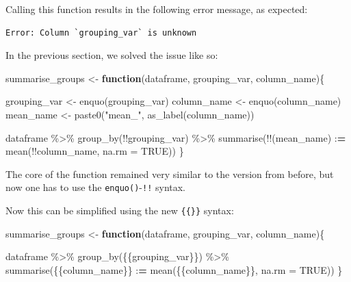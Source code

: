 \documentclass[
]{article}
\newenvironment{Shaded}{\begin{snugshade}}{\end{snugshade}}
\newcommand{\AttributeTok}[1]{\textcolor[rgb]{0.77,0.63,0.00}{#1}}
\newcommand{\ConstantTok}[1]{\textcolor[rgb]{0.00,0.00,0.00}{#1}}
\newcommand{\ControlFlowTok}[1]{\textcolor[rgb]{0.13,0.29,0.53}{\textbf{#1}}}
\newcommand{\ErrorTok}[1]{\textcolor[rgb]{0.64,0.00,0.00}{\textbf{#1}}}
\newcommand{\FunctionTok}[1]{\textcolor[rgb]{0.00,0.00,0.00}{#1}}
\newcommand{\NormalTok}[1]{#1}
\newcommand{\OtherTok}[1]{\textcolor[rgb]{0.56,0.35,0.01}{#1}}
\newcommand{\SpecialCharTok}[1]{\textcolor[rgb]{0.00,0.00,0.00}{#1}}
\newcommand{\StringTok}[1]{\textcolor[rgb]{0.31,0.60,0.02}{#1}}
\begin{document}
Calling this function results in the following error message, as expected:

\begin{verbatim}
Error: Column `grouping_var` is unknown
\end{verbatim}

In the previous section, we solved the issue like so:

\begin{Shaded}
\begin{Highlighting}[]
\NormalTok{summarise\_groups }\OtherTok{\textless{}{-}} \ControlFlowTok{function}\NormalTok{(dataframe, grouping\_var, column\_name)\{}

\NormalTok{  grouping\_var }\OtherTok{\textless{}{-}} \FunctionTok{enquo}\NormalTok{(grouping\_var)}
\NormalTok{  column\_name }\OtherTok{\textless{}{-}} \FunctionTok{enquo}\NormalTok{(column\_name)}
\NormalTok{  mean\_name }\OtherTok{\textless{}{-}} \FunctionTok{paste0}\NormalTok{(}\StringTok{"mean\_"}\NormalTok{, }\FunctionTok{as\_label}\NormalTok{(column\_name))}

\NormalTok{  dataframe }\SpecialCharTok{\%\textgreater{}\%}
    \FunctionTok{group\_by}\NormalTok{(}\SpecialCharTok{!!}\NormalTok{grouping\_var) }\SpecialCharTok{\%\textgreater{}\%}  
    \FunctionTok{summarise}\NormalTok{(}\SpecialCharTok{!!}\NormalTok{(mean\_name) }\SpecialCharTok{:}\ErrorTok{=} \FunctionTok{mean}\NormalTok{(}\SpecialCharTok{!!}\NormalTok{column\_name, }\AttributeTok{na.rm =} \ConstantTok{TRUE}\NormalTok{))}
\NormalTok{\}}
\end{Highlighting}
\end{Shaded}

The core of the function remained very similar to the version from before, but now one has to
use the \texttt{enquo()}-\texttt{!!} syntax.

Now this can be simplified using the new \texttt{\{\{\}\}} syntax:

\begin{Shaded}
\begin{Highlighting}[]
\NormalTok{summarise\_groups }\OtherTok{\textless{}{-}} \ControlFlowTok{function}\NormalTok{(dataframe, grouping\_var, column\_name)\{}

\NormalTok{  dataframe }\SpecialCharTok{\%\textgreater{}\%}
    \FunctionTok{group\_by}\NormalTok{(\{\{grouping\_var\}\}) }\SpecialCharTok{\%\textgreater{}\%}  
    \FunctionTok{summarise}\NormalTok{(\{\{column\_name\}\} }\SpecialCharTok{:}\ErrorTok{=} \FunctionTok{mean}\NormalTok{(\{\{column\_name\}\}, }\AttributeTok{na.rm =} \ConstantTok{TRUE}\NormalTok{))}
\NormalTok{\}}
\end{Highlighting}
\end{Shaded}
\end{document}
